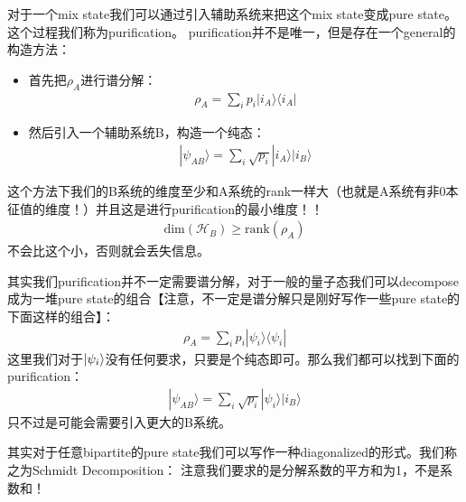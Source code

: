
对于一个mix state我们可以通过引入辅助系统来把这个mix state变成pure
state。这个过程我们称为purification。
purification并不是唯一，但是存在一个general的构造方法：
\begin{itemize}
  \item 首先把$ \rho_A $进行谱分解：
    \begin{align}
      \rho_A = \sum_i p_i |i_A\rangle\langle i_A|
    \end{align}
  \item 然后引入一个辅助系统B，构造一个纯态：
    \begin{align}
      |\psi_{AB}\rangle = \sum_i \sqrt{p_i} |i_A\rangle |i_B\rangle
    \end{align}
\end{itemize}
这个方法下我们的B系统的维度至少和A系统的rank一样大（也就是A系统有非0本征值的维度！）并且这是进行purification的最小维度！！
\begin{align}
  \mathrm{dim}(\mathcal{H}_B) \geq \mathrm{rank}(\rho_A)
\end{align}
不会比这个小，否则就会丢失信息。

\bigskip
{}

其实我们purification并不一定需要谱分解，对于一般的量子态我们可以decompose成为一堆pure
state的组合【注意，不一定是谱分解只是刚好写作一些pure state的下面这样的组合】：
\begin{align}
  \rho_A = \sum_i p_i |\psi_i\rangle\langle\psi_i|
\end{align}
这里我们对于$ \left| \psi_i \right\rangle $没有任何要求，只要是个纯态即可。那么我们都可以找到下面的purification：
\begin{align}
  |\psi_{AB}\rangle = \sum_i \sqrt{p_i} |\psi_i\rangle |i_B\rangle
\end{align}
只不过是可能会需要引入更大的B系统。

\bigskip
{}

其实对于任意bipartite的pure state我们可以写作一种diagonalized的形式。我们称之为Schmidt Decomposition：
注意我们要求的是分解系数的平方和为1，不是系数和！

